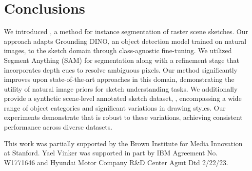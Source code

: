 \section{Conclusions}
We introduced \methodname{}, a method for instance segmentation of raster scene sketches. Our approach adapts Grounding DINO, an object detection model trained on natural images, to the sketch domain through class-agnostic fine-tuning. We utilized Segment Anything (SAM) for segmentation along with a refinement stage that incorporates depth cues to resolve ambiguous pixels.
Our method significantly improves upon state-of-the-art approaches in this domain, demonstrating the utility of natural image priors for sketch understanding tasks. We additionally provide a synthetic scene-level annotated sketch dataset, \datasetname{}, encompassing a wide range of object categories and significant variations in drawing styles. Our experiments demonstrate that \methodname{} is robust to these variations, achieving consistent performance across diverse datasets.

\begin{acks}
This work was partially supported by the Brown Institute for Media Innovation at Stanford. Yael Vinker was supported in part by IBM Agreement No. W1771646 and Hyundai Motor Company R\&D Center Agmt Dtd 2/22/23.
\end{acks}


